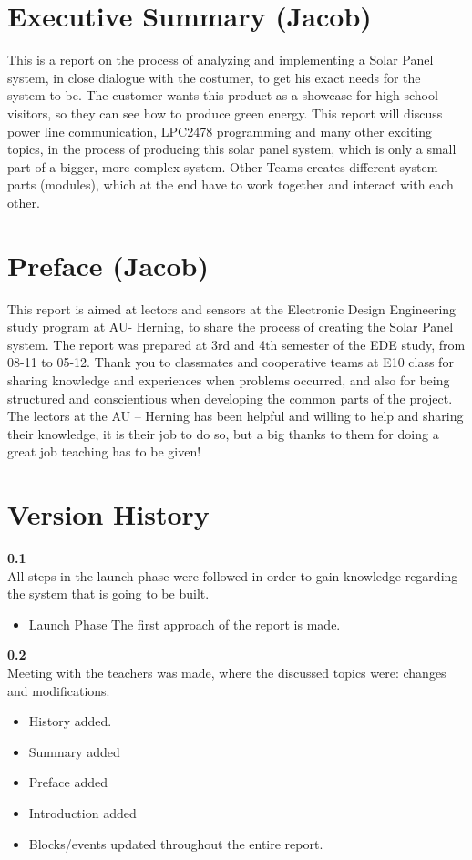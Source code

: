 \chapter{Executive Summary (Jacob)}
This is a report on the process of analyzing and implementing a Solar Panel system, in close dialogue with the costumer, to get his exact needs for the system-to-be. The customer wants this product as a showcase for high-school visitors, so they can see how to produce green energy.
This report will discuss power line communication, LPC2478 programming and many other exciting topics, in the process of producing this solar panel system, which is only a small part of a bigger, more complex system. Other Teams creates different system parts (modules), which at the end have to work together and interact with each other.
\chapter{Preface (Jacob)}
This report is aimed at lectors and sensors at the Electronic Design Engineering study program at AU- Herning, to share the process of creating the Solar Panel system.
The report was prepared at 3rd and 4th semester of the EDE study, from 08-11 to 05-12. Thank you to classmates and cooperative teams at E10 class for sharing knowledge and experiences when problems occurred, and also for being structured and conscientious when developing the common parts of the project.
The lectors at the AU – Herning has been helpful and willing to help and sharing their knowledge, it is their job to do so, but a big thanks to them for doing a great job teaching has to be given!
\chapter{Version History}

\textbf{0.1}\\
All steps in the launch phase were followed in order to gain knowledge regarding the system that is going to be built.

\begin{itemize}
\item Launch Phase
\subitem The first approach of the report is made.
\end{itemize}

\textbf{0.2}\\

Meeting with the teachers was made, where the discussed topics were: changes and modifications.
\begin{itemize}
\item History added.
\item Summary added
\item Preface added
\item Introduction added
\item Blocks/events updated throughout the entire report.
\end{itemize}

